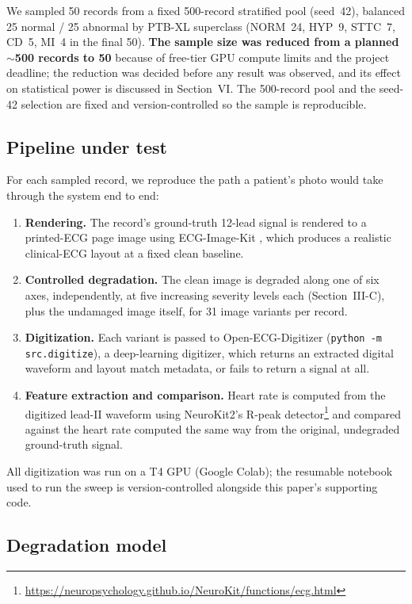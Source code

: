 \documentclass[conference]{IEEEtran}
\begin{document}
We sampled 50 records from a fixed 500-record stratified pool (seed~42), balanced 25
normal / 25 abnormal by PTB-XL superclass (NORM~24, HYP~9, STTC~7, CD~5, MI~4 in the
final 50). \textbf{The sample size was reduced from a planned $\sim$500 records to 50}
because of free-tier GPU compute limits and the project deadline; the reduction was
decided before any result was observed, and its effect on statistical power is
discussed in Section~VI. The 500-record pool and the seed-42 selection are fixed and
version-controlled so the sample is reproducible.

\subsection{Pipeline under test}

For each sampled record, we reproduce the path a patient's photo would take through
the system end to end:

\begin{enumerate}
\item \textbf{Rendering.} The record's ground-truth 12-lead signal is rendered to a
printed-ECG page image using ECG-Image-Kit \cite{ref1}, which produces a realistic
clinical-ECG layout at a fixed clean baseline.
\item \textbf{Controlled degradation.} The clean image is degraded along one of six
axes, independently, at five increasing severity levels each (Section~III-C), plus
the undamaged image itself, for 31 image variants per record.
\item \textbf{Digitization.} Each variant is passed to Open-ECG-Digitizer \cite{ref5}
(\texttt{python -m src.digitize}), a deep-learning digitizer, which returns an
extracted digital waveform and layout match metadata, or fails to return a signal at
all.
\item \textbf{Feature extraction and comparison.} Heart rate is computed from the
digitized lead-II waveform using NeuroKit2's R-peak
detector\footnote{\url{https://neuropsychology.github.io/NeuroKit/functions/ecg.html}}
and compared against the heart rate computed the same way from the original,
undegraded ground-truth signal.
\end{enumerate}

All digitization was run on a T4 GPU (Google Colab); the resumable notebook used to
run the sweep is version-controlled alongside this paper's supporting code.

\subsection{Degradation model}
\end{document}
